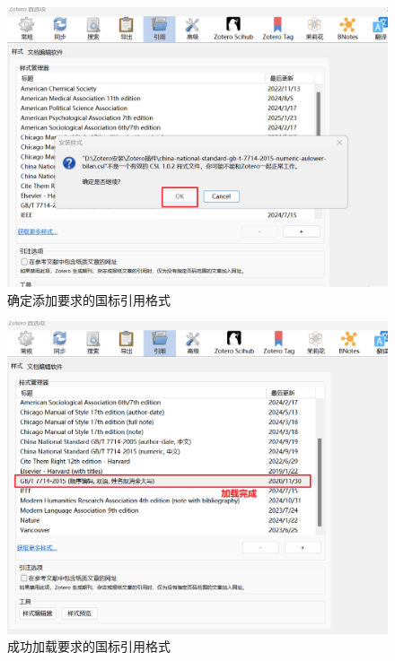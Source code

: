 \documentclass[]{ctexbook}
\theoremstyle{definition}
\theoremstyle{definition}
\theoremstyle{definition}
\theoremstyle{definition}
\theoremstyle{remark}
\begin{document}
\begin{figure}

{\centering \includegraphics[width=1\linewidth]{img/zotero-cite-cn/ciation_setting_3} 

}

\caption{确定添加要求的国标引用格式}\label{fig:ciation-setting-confirm}
\end{figure}

\begin{figure}

{\centering \includegraphics[width=1\linewidth]{img/zotero-cite-cn/ciation_setting_4} 

}

\caption{成功加载要求的国标引用格式}\label{fig:ciation-setting-succeed}
\end{figure}
\end{document}
